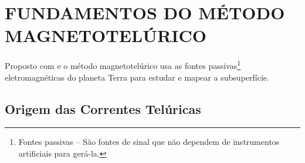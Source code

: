 \chapter{FUNDAMENTOS DO MÉTODO MAGNETOTELÚRICO}

    Proposto com \cite{tikhonov1950determining} e \cite{cagniard1953basic} o método magnetotelúrico usa as fontes passivas\footnote{Fontes passivas -- São fontes de sinal que não dependem de instrumentos artificiais para gerá-la.} eletromagnéticas do planeta Terra para estudar e mapear a subsuperfície.
    
        

    
        
        
        
        
        
    
    \section{Origem das Correntes Telúricas}
    
